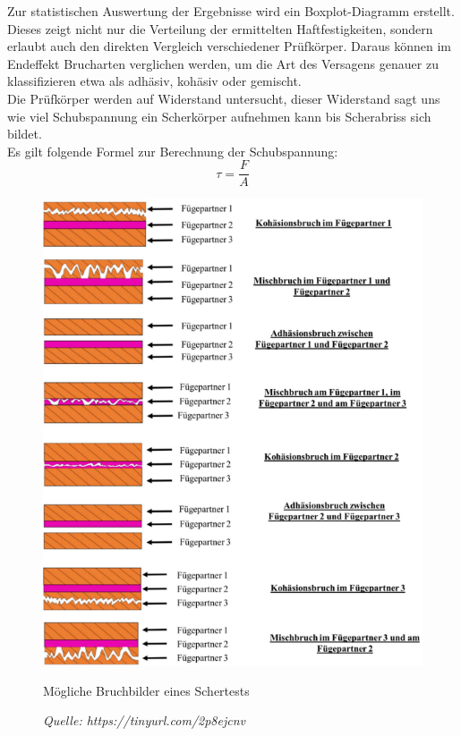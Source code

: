 Zur statistischen Auswertung der Ergebnisse wird ein Boxplot-Diagramm erstellt. Dieses zeigt nicht nur die Verteilung der ermittelten Haftfestigkeiten, sondern erlaubt auch den direkten Vergleich verschiedener Prüfkörper. Daraus können im Endeffekt Brucharten verglichen werden, um die Art des Versagens genauer zu klassifizieren etwa als adhäsiv, kohäsiv oder gemischt.\\
Die Prüfkörper werden auf Widerstand untersucht, dieser Widerstand sagt uns wie viel Schubspannung ein Scherkörper aufnehmen kann bis Scherabriss sich bildet.\\
Es gilt folgende Formel zur Berechnung der Schubspannung:\\
\begin{equation}
    \tau = \frac{F}{A}
\end{equation}   
\vspace{0.2cm}
\begin{figure}
    \centering
    \includegraphics{Bilder/Brucharten.png}
    \caption{Mögliche Bruchbilder eines Schertests}
    \caption*{\textit{Quelle: https://tinyurl.com/2p8ejcnv }}
    \vspace{0.2cm}
    \label{Abb.3: Mögliche Bruchbilder eines Schertests}
\end{figure}
\\
